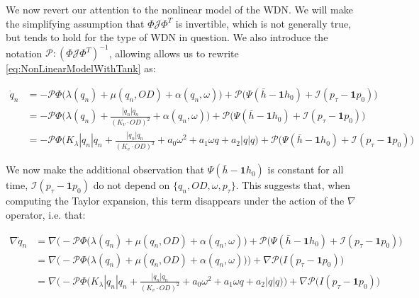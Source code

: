 We now revert our attention to the nonlinear model of the WDN. We will make the simplifying assumption that $\Phi \mathcal{J} \Phi^T$ is invertible, which is not generally true, but tends to hold for the type of WDN in question. We also introduce the notation $\mathcal{P}: (\Phi \mathcal{J} \Phi^T)^{-1}$, allowing allows us to rewrite \cref{eq:NonLinearModelWithTank} as:

\begin{equation}\label{eq:NonLinearModelSimplified}
	\begin{split}
		\dot{q}_n &=  -\mathcal{P}\Phi\Big(\lambda(q_n)+\mu(q_n,OD)+\alpha(q_n,\omega)\Big) + \mathcal{P}\Big(\Psi(\bar{h}-\mathbf{1}h_0) + \mathcal{I}(p_{\tau}-\mathbf{1}p_0)\Big) \\
		&= 	-\mathcal{P}\Phi\Big(\lambda(q_n)+\frac{|q_n|q_n}{(K_v\cdot OD)^2}+\alpha(q_n,\omega)\Big) + 	\mathcal{P}\Big(\Psi(\bar{h}-\mathbf{1}h_0) + \mathcal{I}(p_{\tau}-\mathbf{1}p_0)\Big) \\
		& = -\mathcal{P}\Phi\Big(K_\lambda|q_n|q_n+\frac{|q_n|q_n}{(K_v\cdot OD)^2}+a_0\omega^2+a_1\omega q+a_2|q|q\Big) + \mathcal{P}\Big(\Psi(\bar{h}-\mathbf{1}h_0) + \mathcal{I}(p_{\tau}-\mathbf{1}p_0)\Big)
	\end{split}	
\end{equation}

We now make the additional observation that $\Psi(\bar{h}-\mathbf{1}h_0)$ is constant for all time,   $\mathcal{I}(p_{\tau}-\mathbf{1}p_0)$ do not depend on $\{q_n,OD,\omega,p_\tau\}$. This suggests that, when computing the Taylor expansion, this term disappears under the action of the $\nabla$ operator, i.e. that:

\begin{equation}\label{eq:PressureHeightDisappear}
	\begin{split}
		\nabla \dot{q}_n &= \nabla \Big(-\mathcal{P}\Phi\Big(\lambda(q_n)+\mu(q_n,OD)+\alpha(q_n,\omega)\Big) + \mathcal{P}\Big(\Psi(\bar{h}-\mathbf{1}h_0) + \mathcal{I}(p_{\tau}-\mathbf{1}p_0)\Big) \\ 
		&=\nabla \Big(-\mathcal{P}\Phi\Big(\lambda(q_n)+\mu(q_n,OD)+\alpha(q_n,\omega)\Big)\Big) + \nabla \mathcal{P}\Big({I}(p_{\tau}-\mathbf{1}p_0)\Big) \\
		&=\nabla \Big(-\mathcal{P}\Phi\Big(K_\lambda|q_n|q_n+\frac{|q_n|q_n}{(K_v\cdot OD)^2}+a_0\omega^2+a_1\omega q+a_2|q|q\Big)\Big) + \nabla \mathcal{P}\Big({I}(p_{\tau}-\mathbf{1}p_0)\Big)
	\end{split}
\end{equation}

